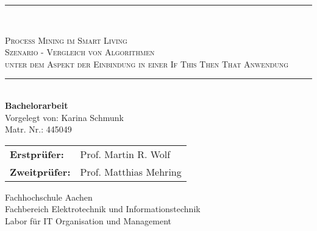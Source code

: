 \begin{titlepage}
\begin{center}
\hfill
\newcommand{\HorizontalLine}{\rule{\linewidth}{0.3mm}}
\HorizontalLine \\[0.4cm]
\begin{spacing}{2.5}
    \textsc{\Large  Process Mining im Smart Living} \\
    \textsc{\Large  Szenario - Vergleich von Algorithmen} \\
    \textsc{\Large   unter dem Aspekt der Einbindung in einer If This Then That Anwendung}\\
\end{spacing}
\vspace{20mm}
\HorizontalLine \\[0.5cm]

{\Large \bfseries Bachelorarbeit}\\[1.1cm]
{\large Vorgelegt von: Karina Schmunk} \\[1cm]
{\large Matr. Nr.: 445049} \\[1.2cm]

\begin{tabular}[hc]{>{\large}l >{\large}l}
  \bfseries Erstprüfer: & Prof. Martin R. Wolf \\[0.3cm]
  \bfseries Zweitprüfer: & Prof. Matthias Mehring \\[1.2cm]
\end{tabular}
\vfill  %

\Large {
    Fachhochschule Aachen\\
    Fachbereich Elektrotechnik und Informationstechnik\\
    Labor für IT Organisation und Management\\[1cm]

    
}
\end{center}
\end{titlepage}
